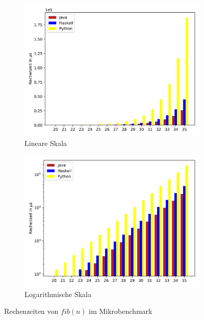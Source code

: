 \documentclass[11pt, parskip=half]{scrartcl}       %
\begin{document}
\begin{figure}[h]
  \centering
  \begin{subfigure}{0.5\textwidth}
    \centering
    \includegraphics[width=\textwidth]{src/linear-microbench.pdf}
    \caption{Lineare Skala}
    \label{fig:micro-lin}
  \end{subfigure}%
  \begin{subfigure}{0.5\textwidth}
    \centering
    \includegraphics[width=\textwidth]{src/log-microbench.pdf}
    \caption{Logarithmische Skala}
    \label{fig:micro-log}
  \end{subfigure}
  \caption{Rechenzeiten von $fib(n)$ im Mikrobenchmark}
  \label{fig:micro}
\end{figure}
\end{document}
